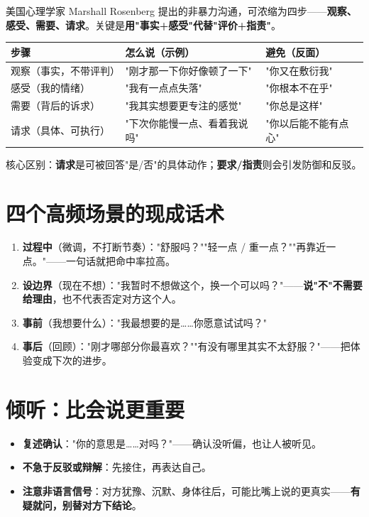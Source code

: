 美国心理学家 Marshall Rosenberg 提出的非暴力沟通，可浓缩为四步——\textbf{观察、感受、需要、请求}。关键是\textbf{用"事实+感受"代替"评价+指责"}。

\begin{tabularx}{\textwidth}{p{2.6cm}XX}
\toprule
步骤 & 怎么说（示例） & 避免（反面） \\
\midrule
观察（事实，不带评判） & "刚才那一下你好像顿了一下" & "你又在敷衍我" \\
感受（我的情绪） & "我有一点点失落" & "你根本不在乎" \\
需要（背后的诉求） & "我其实想要更专注的感觉" & "你总是这样" \\
请求（具体、可执行） & "下次你能慢一点、看着我说吗" & "你以后能不能有点心" \\
\bottomrule
\end{tabularx}

\vspace{0.5em}
\noindent 核心区别：\textbf{请求}是可被回答"是/否"的具体动作；\textbf{要求/指责}则会引发防御和反驳。

\section{四个高频场景的现成话术}

\begin{enumerate}[leftmargin=2em,itemsep=0.3em]
  \item \textbf{过程中}（微调，不打断节奏）："舒服吗？""轻一点 / 重一点？""再靠近一点。"——一句话就把命中率拉高。
  \item \textbf{设边界}（现在不想）："我暂时不想做这个，换一个可以吗？"——\textbf{说"不"不需要给理由}，也不代表否定对方这个人。
  \item \textbf{事前}（我想要什么）："我最想要的是……你愿意试试吗？"
  \item \textbf{事后}（回顾）："刚才哪部分你最喜欢？""有没有哪里其实不太舒服？"——把体验变成下次的进步。
\end{enumerate}

\section{倾听：比会说更重要}

\begin{itemize}[leftmargin=2em,itemsep=0.3em]
  \item \textbf{复述确认}："你的意思是……对吗？"——确认没听偏，也让人被听见。
  \item \textbf{不急于反驳或辩解}：先接住，再表达自己。
  \item \textbf{注意非语言信号}：对方犹豫、沉默、身体往后，可能比嘴上说的更真实——\textbf{有疑就问，别替对方下结论}。
\end{itemize}

